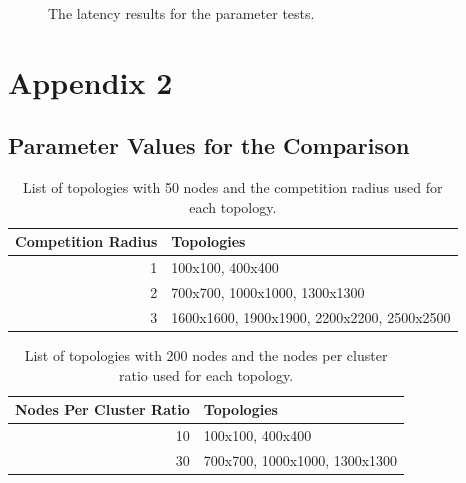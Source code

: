 \begin{figure}[H]
    \caption{The latency results for the parameter tests.}
    \label{fig:parameter-tests-latency}
\end{figure}

\chapter{Appendix 2}
\section{Parameter Values for the \atwo{} Comparison}
\label{app:parameter-values-for-the-atwo-comparison}
\begin{table}[H]
\centering
\caption{List of topologies with 50 nodes and the competition radius used for each topology.}
\label{tab:50-nodes-competition-radius-value}
\begin{tabular}{|r|l|l|l|l|}
\hline
\multicolumn{1}{|c|}{\textbf{Competition Radius}} & \multicolumn{4}{l|}{\textbf{Topologies}}                        \\ \hline
1                                                 & \multicolumn{4}{l|}{100x100, 400x400}                           \\ \hline
2                                                 & \multicolumn{4}{l|}{700x700, 1000x1000, 1300x1300}              \\ \hline
3                                                 & \multicolumn{4}{l|}{1600x1600, 1900x1900, 2200x2200, 2500x2500} \\ \hline
\end{tabular}
\end{table}

\begin{table}[H]
\centering
\caption{List of topologies with 200 nodes and the nodes per cluster ratio used for each topology.}
\label{tab:50-nodes-nodes-per-cluster-ratio-value}
\begin{tabular}{|r|l|}
\hline
\textbf{Nodes Per Cluster Ratio} & \textbf{Topologies}           \\ \hline
10                               & 100x100, 400x400              \\ \hline
30                               & 700x700, 1000x1000, 1300x1300 \\ \hline
\end{tabular}
\end{table}

%
%